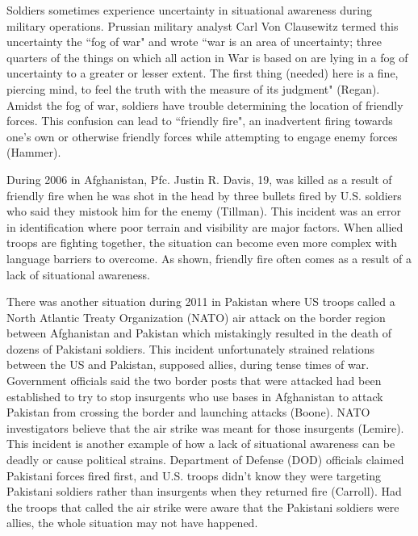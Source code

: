 Soldiers sometimes experience uncertainty in situational awareness during
military operations. Prussian military analyst Carl Von Clausewitz termed this
uncertainty the ``fog of war" and wrote ``war is an area of uncertainty; three
quarters of the things on which all action in War is based on are lying in a
fog of uncertainty to a greater or lesser extent. The first thing (needed) here
is a fine, piercing mind, to feel the truth with the measure of its judgment"
(Regan). Amidst the fog of war, soldiers have trouble determining the
location of friendly forces. This confusion can lead to ``friendly fire", an
inadvertent firing towards one's own or otherwise friendly forces while
attempting to engage enemy forces (Hammer).

During 2006 in Afghanistan, Pfc. Justin R. Davis, 19, was killed as a
result of friendly fire when he was shot in the head by three bullets fired by
U.S. soldiers who said they mistook him for the enemy (Tillman).
This incident was an error in identification where poor terrain and visibility
are major factors. When allied troops are fighting together, the situation can
become even more complex with language barriers to overcome. As shown, friendly
fire often comes as a result of a lack of situational awareness.

There was another situation during 2011 in Pakistan where US troops called
a North Atlantic Treaty Organization (NATO) air attack on the border region
between Afghanistan and Pakistan which mistakingly resulted in the death of
dozens of Pakistani soldiers. This incident unfortunately strained relations
between the US and Pakistan, supposed allies, during tense times of war.
Government officials said the two border posts that were attacked had been
established to try to stop insurgents who use bases in Afghanistan to attack
Pakistan from crossing the border and launching attacks (Boone).
NATO investigators believe that the air strike was meant for those insurgents
(Lemire). This incident is another example of how a lack of
situational awareness can be deadly or cause political strains. Department of
Defense (DOD) officials claimed Pakistani forces fired first, and U.S. troops
didn’t know they were targeting Pakistani soldiers rather than insurgents when
they returned fire (Carroll). Had the troops that called the air
strike were aware that the Pakistani soldiers were allies, the whole situation
may not have happened.

